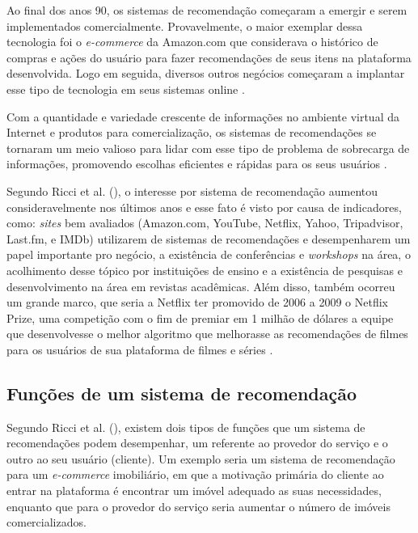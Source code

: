 Ao final dos anos 90, os sistemas de recomendação começaram a emergir e serem implementados comercialmente. Provavelmente, o maior exemplar dessa tecnologia foi o \textit{e-commerce} da Amazon.com que considerava o histórico de compras e ações do usuário para fazer recomendações de seus itens na plataforma desenvolvida. Logo em seguida, diversos outros negócios começaram a implantar esse tipo de tecnologia em seus sistemas online \cite{Ekstrand:2011:CFR:2185827.2185828}.

Com a quantidade e variedade crescente de informações no ambiente virtual da Internet e produtos para comercialização, os sistemas de recomendações se tornaram um meio valioso para lidar com esse tipo de problema de sobrecarga de informações, promovendo escolhas eficientes e rápidas para os seus usuários \cite{Ricci:2010}.

Segundo Ricci et al. (\citeyear{Ricci:2010}), o interesse por sistema de recomendação aumentou consideravelmente nos últimos anos e esse fato é visto por causa de  indicadores, como: \textit{sites} bem avaliados (Amazon.com, YouTube, Netflix, Yahoo, Tripadvisor, Last.fm, e IMDb) utilizarem de sistemas de recomendações e desempenharem um papel importante pro negócio, a existência de conferências e \textit{workshops} na área, o acolhimento desse tópico por instituições de ensino e a existência de pesquisas e desenvolvimento na área em revistas acadêmicas. Além disso, também ocorreu um grande marco, que seria a Netflix ter promovido de 2006 a 2009 o Netflix Prize, uma competição com o fim de premiar em 1 milhão de dólares a equipe que desenvolvesse o melhor algoritmo que melhorasse as recomendações de filmes para os usuários de sua plataforma de filmes e séries \cite{netflixprize:2009}.

\subsection{Funções de um sistema de recomendação}

Segundo Ricci et al. (\citeyear{Ricci:2010}), existem dois tipos de funções que um sistema de recomendações podem desempenhar, um referente ao provedor do serviço e o outro ao seu usuário (cliente). Um exemplo seria um sistema de recomendação para um \textit{e-commerce} imobiliário, em que a motivação primária do cliente ao entrar na plataforma é encontrar um imóvel adequado as suas necessidades, enquanto que para o provedor do serviço seria aumentar o número de imóveis comercializados.

